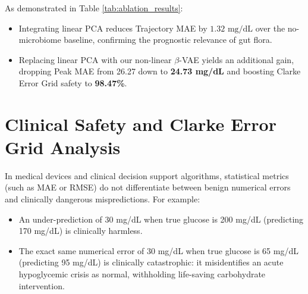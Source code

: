 \begin{table}[!htbp]
\centering
\caption{Microbiome Modality Ablation Analysis on TransformerForecaster}
\label{tab:ablation_results}
\end{table}

As demonstrated in Table \ref{tab:ablation_results}:
\begin{itemize}
    \item Integrating linear PCA reduces Trajectory MAE by $1.32\text{ mg/dL}$ over the no-microbiome baseline, confirming the prognostic relevance of gut flora.
    \item Replacing linear PCA with our non-linear $\beta$-VAE yields an additional gain, dropping Peak MAE from 26.27 down to \textbf{24.73 mg/dL} and boosting Clarke Error Grid safety to \textbf{98.47\%}.
\end{itemize}

\section{Clinical Safety and Clarke Error Grid Analysis}
In medical devices and clinical decision support algorithms, statistical metrics (such as MAE or RMSE) do not differentiate between benign numerical errors and clinically dangerous mispredictions. For example:
\begin{itemize}
    \item An under-prediction of 30 mg/dL when true glucose is 200 mg/dL (predicting 170 mg/dL) is clinically harmless.
    \item The exact same numerical error of 30 mg/dL when true glucose is 65 mg/dL (predicting 95 mg/dL) is clinically catastrophic: it misidentifies an acute hypoglycemic crisis as normal, withholding life-saving carbohydrate intervention.
\end{itemize}

